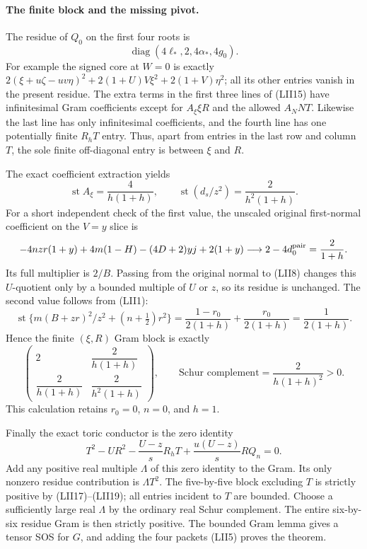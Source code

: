\paragraph{The finite block and the missing pivot.}
The residue of $Q_0$ on the first four roots is
\[
             \operatorname{diag}(4\ell_*,2,4\alpha_*,4g_0).
                                                        \tag{LII17}
\]
For example the signed core at $W=0$ is exactly
$2(\xi+u\zeta-uv\eta)^2+2(1+U)V\xi^2+2(1+V)\eta^2$;
all its other entries vanish in the present residue.  The extra
terms in the first three lines of (LII15) have infinitesimal Gram
coefficients except for $A_\xi\xi R$ and the allowed $A_NNT$.
Likewise the last line has only infinitesimal coefficients, and
the fourth line has one potentially finite $R_hT$ entry.  Thus,
apart from entries in the last row and column $T$, the sole finite
off-diagonal entry is between $\xi$ and $R$.

The exact coefficient extraction yields
\[
 \operatorname{st}A_\xi=\frac4{h(1+h)},\qquad
 \operatorname{st}(d_s/z^2)=\frac2{h^2(1+h)}.     \tag{LII18}
\]
For a short independent check of the first value, the unscaled
original first-normal coefficient on the $V=y$ slice is
\[
 -4nzr(1+y)+4m(1-H)-(4D+2)yj+2(1+y)
 \longrightarrow 2-4d_0^{\rm pair}=\frac2{1+h}.
\]
Its full multiplier is $2/B$.  Passing from the original normal
to (LII8) changes this $U$-quotient only by a bounded multiple of
$U$ or $z$, so its residue is unchanged.  The second value follows
from (LII1):
\[
 \operatorname{st}\{m(B+zr)^2/z^2+(n+\tfrac12)r^2\}
 =\frac{1-r_0}{2(1+h)}+\frac{r_0}{2(1+h)}
 =\frac1{2(1+h)}.
\]
Hence the finite $(\xi,R)$ Gram block is exactly
\[
 \begin{pmatrix}
  2&\dfrac2{h(1+h)}\\[2mm]
  \dfrac2{h(1+h)}&\dfrac2{h^2(1+h)}
 \end{pmatrix},\qquad
 \text{Schur complement}=\frac2{h(1+h)^2}>0.      \tag{LII19}
\]
This calculation retains $r_0=0$, $n=0$, and $h=1$.

Finally the exact toric conductor is the zero identity
\[
 \boxed{\quad
 T^2-UR^2-\frac{U-z}{s}R_hT
             +\frac{u(U-z)}s RQ_n=0.\quad}       \tag{LII20}
\]
Add any positive real multiple $\Lambda$ of this zero identity to
the Gram.  Its only nonzero residue contribution is $\Lambda T^2$.
The five-by-five block excluding $T$ is strictly positive by
(LII17)--(LII19); all entries incident to $T$ are bounded.  Choose
a sufficiently large real $\Lambda$ by the ordinary real Schur
complement.  The entire six-by-six residue Gram is then strictly
positive.  The bounded Gram lemma gives a tensor SOS for $G$, and
adding the four packets (LII5) proves the theorem.

